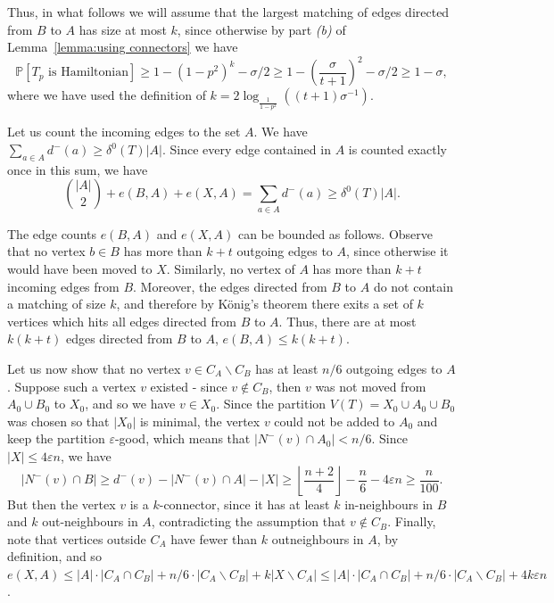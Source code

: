 \documentclass[a4paper,11pt]{article}
\makeatletter
\renewenvironment{proof}[1][\proofname] {\par\pushQED{\qed}\normalfont\topsep6\p@\@plus6\p@\relax\trivlist\item[\hskip\labelsep\textit{#1}\@addpunct{.}]\ignorespaces}{\popQED\endtrivlist\@endpefalse}
\theoremstyle{definition}
\def\eps{\varepsilon}
\def\Pb{\mathbb{P}}
\makeatother
\begin{document}
\begin{proof}[Proof of Theorem~\ref{thm:main}.]
Thus, in what follows we will assume that the largest matching of edges directed from $B$ to $A$ has size at most $k$, since otherwise by part \textit{(b)} of Lemma~\ref{lemma:using connectors} we have \[\Pb[T_p\text{ is Hamiltonian}]\geq 1-(1-p^2)^k-\sigma/2\geq 1-\left(\frac{\sigma}{t+1}\right)^2-\sigma/2\geq 1-\sigma,\]
where we have used the definition of $k=2\log_{\frac{1}{1-p^2}}((t+1)\sigma^{-1})$.

\medskip

Let us count the incoming edges to the set $A$. We have $\sum_{a\in A}d^{-} (a)\geq \delta^0(T) |A|$. Since every edge contained in $A$ is counted exactly once in this sum, we have
\[\binom{|A|}{2}+e(B, A)+e(X, A)= \sum_{a\in A}d^{-}(a)\geq \delta^0(T) |A|.\]

The edge counts $e(B, A)$ and $e(X, A)$ can be bounded as follows. Observe that no vertex $b\in B$ has more than $k+t$ outgoing edges to $A$, since otherwise it would have been moved to $X$. Similarly, no vertex of $A$ has more than $k+t$ incoming edges from $B$. Moreover, the edges directed from $B$ to $A$ do not contain a matching of size $k$, and therefore by K\"onig's theorem there exits a set of $k$ vertices which hits all edges directed from $B$ to $A$. Thus, there are at most $k(k+t)$ edges directed from $B$ to $A$, $e(B, A)\leq k(k+t)$.

Let us now show that no vertex $v\in C_A\backslash C_B$ has at least $n/6$ outgoing edges to $A$. Suppose such a vertex $v$ existed - since $v\notin C_B$, then $v$ was not moved from $A_0\cup B_0$ to $X_0$, and so we have $v\in X_0$. Since the partition $V(T)=X_0\cup A_0\cup B_0$ was chosen so that $|X_0|$ is minimal, the vertex $v$ could not be added to $A_0$ and keep the partition $\eps$-good, which means that $|N^-(v)\cap A_0|< n/6$. Since $|X|\leq 4\eps n$, we have \[|N^-(v)\cap B|\geq d^-(v)-|N^{-}(v)\cap A|-|X|\geq \left\lfloor \frac{n+2}{4}\right\rfloor-\frac{n}{6}-4\eps n\geq \frac{n}{100}.\]
But then the vertex $v$ is a $k$-connector, since it has at least $k$ in-neighbours in $B$ and $k$ out-neighbours in $A$, contradicting the assumption that $v\notin C_B$. Finally, note that vertices outside $C_A$ have fewer than $k$ outneighbours in $A$, by definition, and so $e(X, A)\leq |A|\cdot |C_A\cap C_B|+n/6\cdot |C_A\backslash C_B| + k|X\backslash C_A|\leq |A|\cdot |C_A\cap C_B|+n/6\cdot|C_A\backslash C_B|+4k\eps n$. 


\end{proof}
\end{document}
